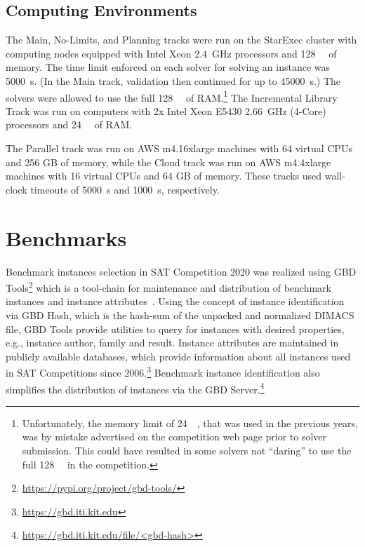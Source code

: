 \documentclass{elsarticle}
\begin{document}
\subsection{Computing Environments}

\label{sec:computing}
The Main, No-Limits, and Planning tracks were run on the StarExec cluster \cite{starexec}
with computing nodes  equipped with Intel Xeon \SI{2.4}{\giga\hertz} processors 
and \SI{128}{\giga\byte} of memory.
The time limit enforced on each solver for solving an instance was \SI{5000}{\second}. 
(In the Main track, validation then continued for up to \SI{45000}{\second}.)
The solvers were allowed to use the full \SI{128}{\giga\byte} of RAM.\footnote{
Unfortunately, the memory limit of \SI{24}{\giga\byte}, that was used in the previous years,
was by mistake advertised on the competition web page prior to solver submission.
This could have resulted in some solvers not ``daring'' to use the full \SI{128}{\giga\byte}
in the competition.}
The Incremental Library Track was run on computers with 2x Intel Xeon E5430 \SI{2.66}{\giga\hertz}
(4-Core) processors and \SI{24}{\giga\byte} of RAM.

The Parallel track was run on AWS m4.16xlarge machines with 64 virtual CPUs and 256 GB
of memory, while the Cloud track was run on AWS m4.4xlarge machines with 16 virtual CPUs and 64 GB of
memory. These tracks used wall-clock timeouts of \SI{5000}{\second} and \SI{1000}{\second}, respectively.

\section{Benchmarks}
\label{sec:instances}

Benchmark instances selection in SAT Competition  2020 was realized using GBD Tools\footnote{\url{https://pypi.org/project/gbd-tools/}} which is a tool-chain for maintenance and distribution of benchmark instances and instance attributes~\cite{Iser:2018:GBD}.
Using the concept of instance identification via GBD Hash, which is the hash-sum of the unpacked and normalized DIMACS file, GBD Tools provide utilities to query for instances with desired properties, e.g., instance author, family and result.
Instance attributes are maintained in publicly available databases, which provide information about all instances used in SAT Competitions since 2006.\footnote{\url{https://gbd.iti.kit.edu}} 
Benchmark instance identification also simplifies the distribution of instances via the GBD Server.\footnote{\url{https://gbd.iti.kit.edu/file/<gbd-hash>}}
\end{document}

